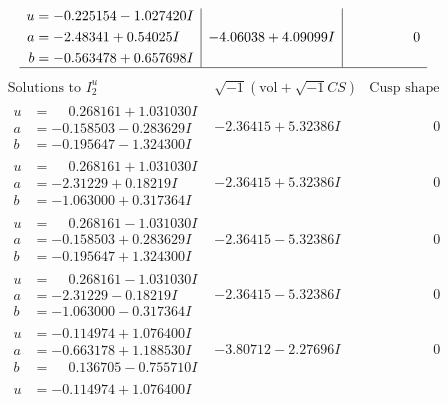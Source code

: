 \documentclass[1p]{elsarticle_modified}
\theoremstyle{definition}
\newcommand{\I}{\sqrt{-1}}
\begin{document}
$$\begin{array}{c|c|c}
\begin{aligned}
u &= -0.225154 - 1.027420 I \\
a &= -2.48341 + 0.54025 I \\
b &= -0.563478 + 0.657698 I\end{aligned}
 & -4.06038 + 4.09099 I & \phantom{-0.000000 } 0\\
 \hline 
 \end{array}$$\newpage$$\begin{array}{c|c|c}  
\text{Solutions to }I^u_{2}& \I (\text{vol} + \sqrt{-1}CS) & \text{Cusp shape}\\
 \hline 
\begin{aligned}
u &= \phantom{-}0.268161 + 1.031030 I \\
a &= -0.158503 - 0.283629 I \\
b &= -0.195647 - 1.324300 I\end{aligned}
 & -2.36415 + 5.32386 I & \phantom{-0.000000 } 0 \\ \hline\begin{aligned}
u &= \phantom{-}0.268161 + 1.031030 I \\
a &= -2.31229 + 0.18219 I \\
b &= -1.063000 + 0.317364 I\end{aligned}
 & -2.36415 + 5.32386 I & \phantom{-0.000000 } 0 \\ \hline\begin{aligned}
u &= \phantom{-}0.268161 - 1.031030 I \\
a &= -0.158503 + 0.283629 I \\
b &= -0.195647 + 1.324300 I\end{aligned}
 & -2.36415 - 5.32386 I & \phantom{-0.000000 } 0 \\ \hline\begin{aligned}
u &= \phantom{-}0.268161 - 1.031030 I \\
a &= -2.31229 - 0.18219 I \\
b &= -1.063000 - 0.317364 I\end{aligned}
 & -2.36415 - 5.32386 I & \phantom{-0.000000 } 0 \\ \hline\begin{aligned}
u &= -0.114974 + 1.076400 I \\
a &= -0.663178 + 1.188530 I \\
b &= \phantom{-}0.136705 - 0.755710 I\end{aligned}
 & -3.80712 - 2.27696 I & \phantom{-0.000000 } 0 \\ \hline\begin{aligned}
u &= -0.114974 + 1.076400 I \\

\end{aligned}
\end{array}$$
\end{document}
